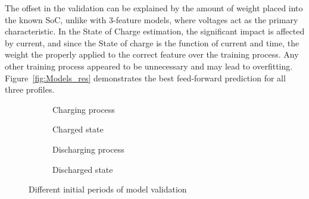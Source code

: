     The offset in the validation can be explained by the amount of weight placed into the known SoC, unlike with 3-feature models, where voltages act as the primary characteristic.
    In the State of Charge estimation, the significant impact is affected by current, and since the State of charge is the function of current and time, the weight the properly applied to the correct feature over the training process.
    Any other training process appeared to be unnecessary and may lead to overfitting.
    \mbox{Figure~\ref{fig:Models_res}} demonstrates the best feed-forward prediction for all three profiles.
{
    \begin{figure*}[htbp]
        \centering
        \begin{subfigure}[b]{0.475\textwidth}
            \centering
            
            \caption{Charging process}
        \end{subfigure}
        \hfill
        \begin{subfigure}[b]{0.475\textwidth}
            \centering
            
            \caption{Charged state}
        \end{subfigure}
        \hfill
        \begin{subfigure}[b]{0.475\textwidth}
            \centering
            
            \caption{Discharging process}
        \end{subfigure}
        \begin{subfigure}[b]{0.475\textwidth}
            \centering
            
            \caption{Discharged state}
        \end{subfigure}
        \caption{Different initial periods of model validation}
        \label{fig:init_time}
    \end{figure*}
} { }
